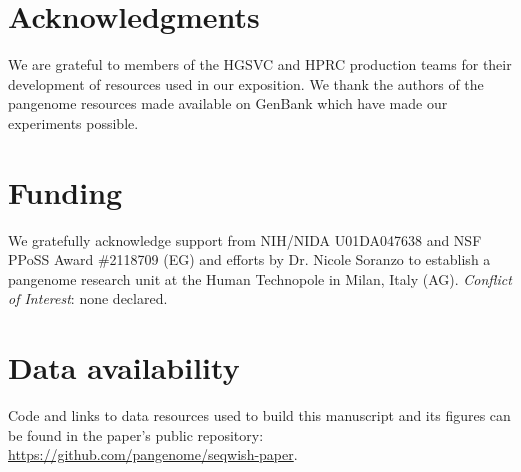 \documentclass{bioinfo}
\theoremstyle{definition}
\begin{document}

\section*{Acknowledgments}

We are grateful to members of the HGSVC and HPRC production teams for their development of resources used in our exposition.
We thank the authors of the pangenome resources made available on GenBank which have made our experiments possible.

\section*{Funding}

We gratefully acknowledge support from NIH/NIDA U01DA047638 and NSF PPoSS Award \#2118709 (EG) and efforts by Dr. Nicole Soranzo to establish a pangenome research unit at the Human Technopole in Milan, Italy (AG).
\linebreak
\linebreak
\textit{Conflict of Interest}: none declared.

\section*{Data availability}

Code and links to data resources used to build this manuscript and its figures can be found in the paper's public repository: \url{https://github.com/pangenome/seqwish-paper}.




\end{document}
